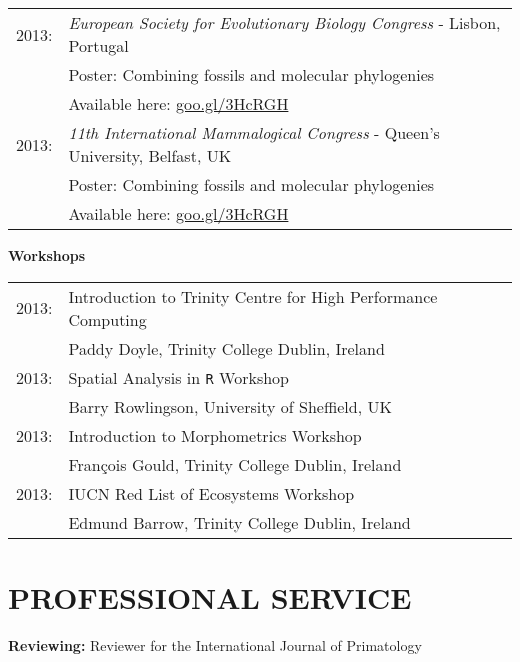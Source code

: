 \documentclass[10pt,a4paper]{article}
\begin{document}
{\begin{tabular}{ll}
2013: & \textit{European Society for Evolutionary Biology Congress} - Lisbon, Portugal\\
& Poster: Combining fossils and molecular phylogenies\\
& Available here: \href{http://figshare.com/articles/Combining_fossils_and_molecular_phylogenies/1056300}{goo.gl/3HcRGH}\\
2013: & \textit{11th International Mammalogical Congress} - Queen's University, Belfast, UK \\
& Poster: Combining fossils and molecular phylogenies\\
& Available here: \href{http://figshare.com/articles/Combining_fossils_and_molecular_phylogenies/1056300}{goo.gl/3HcRGH}\\
\end{tabular}
\bigskip

\raggedright\textbf{Workshops}\\[1.5ex]
\begin{tabular}{ll}
2013: & Introduction to Trinity Centre for High Performance Computing\\
& Paddy Doyle, Trinity College Dublin, Ireland\\
2013: & Spatial Analysis in \texttt{R} Workshop\\
& Barry Rowlingson, University of Sheffield, UK\\
2013: & Introduction to Morphometrics Workshop\\
& Fran\c{c}ois Gould, Trinity College Dublin, Ireland\\
2013: & IUCN Red List of Ecosystems Workshop\\
& Edmund Barrow, Trinity College Dublin, Ireland\\


\end{tabular}
\bigskip


\section{PROFESSIONAL SERVICE}
\raggedright\textbf{Reviewing:}
Reviewer for the International Journal of Primatology
\bigskip

}
\end{document}

